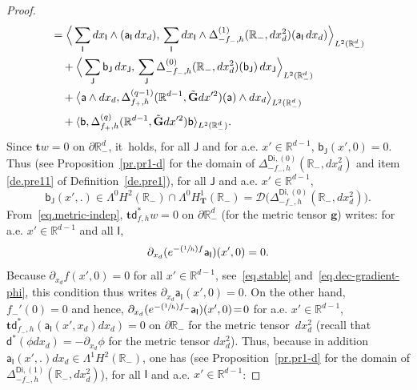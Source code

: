 \documentclass[JEP,XML,SOM,Unicode,NoEqCountersInSection,NoFloatCountersInSection,published]{cedram}
\newcommand{\Psfrac}[2]{(\sfrac{#1}{#2})}
\newcommand{\mbf}[1]{\mathbf{#1}}
\let\lp\langle
\let\rp\rangle
\let\pa\partial
\theoremstyle{plain}
\theoremstyle{definition}
\begin{document}
\begin{proof}
\begin{align}
&= \Big \lp \sum_{\mathsf I} dx_{\mathsf I}\wedge (\mathsf a_{\mathsf I}\, dx_d), \, \sum_{ \mathsf I } dx_{\mathsf I}\wedge\Delta^{(1)}_{-f_-,h}(\mathbb R_-,dx_d^2)(\mathsf a_{\mathsf I} \, dx_d)\Big\rp_{L^2(\mathbb R^d_-)} \\
\nonumber
&\quad + \Big \lp \sum_{ \mathsf J } \mathsf b_{\mathsf J}\, dx_{\mathsf J},\, \sum_{ \mathsf J } \Delta^{(0)}_{-f_-,h}(\mathbb R_-,dx_d^2)(\mathsf b_{\mathsf J})\, dx_{\mathsf J}\Big\rp_{L^2(\mathbb R^d_-)}\\
\nonumber
&\quad +\big \lp \mathsf a \wedge dx_d,\Delta^{(q-1)}_{f_+,h}(\mathbb R^{d-1}, \tilde{\mbf G}dx'^2)(\mathsf a)\wedge dx_d \big\rp_{L^2(\mathbb R^d_-)} \\
&\quad +\lp \mathsf b,\Delta^{(q)}_{f_+,h}(\mathbb R^{d-1}, \tilde{\mbf G}dx'^2)\mathsf b\rp_{L^2(\mathbb R^d_-)}.\notag
\end{align}
Since $\mbf t w =0$ on $\pa \mathbb R^d_-$, it~holds, for all
$\mathsf J$ and for a.e. $x'\in \mathbb R^{d-1}$, $ \mathsf
b_{\mathsf J}(x',0)=0$. Thus (see Proposition~\ref{pr.pr1-d} for the
domain of $\Delta_{-f_-,h}^{\mathsf{Di},(0)}(\mathbb R_-, dx_d^2)$ and
item \eqref{de.pre11} of Definition~\ref{de.pre1}),
for all $\mathsf J$ and a.e. $x'\in \mathbb R^{d-1}$,
\[
\mathsf b_{\mathsf J}(x',.)\in \Lambda^0H^2 (\mathbb R_-)\cap
\Lambda^0H^1_{\mbf T} (\mathbb R_-) = \mathcal D \bigl(\Delta_{-f_-,h}^{\mathsf{Di},(0)}(\mathbb R_-, dx_d^2) \bigr).
\]
From~\eqref{eq.metric-indep}, $\mbf t \mathsf d_{f,h}^*w =0$ on $\pa \mathbb R^d_-$ (for the metric tensor $ \mbf g$) writes: for a.e. $x'\in \mathbb R^{d-1}$ and all $\mathsf I$,
\begin{equation}\label{eq.domd*}
\partial_{x_d}(e^{-\Psfrac 1hf}\mathsf a_{\mathsf I})(x',0)=0.
\end{equation}
Because $\partial_{x_d} f(x',0)=0$ for all $x'\in \mathbb R^{d-1}$, see~\eqref{eq.stable} and~\eqref{eq.dec-gradient-phi}, this condition thus writes $\partial_{x_d}\mathsf a_{\mathsf I}(x',0)\!=\!0$. On the other hand, $f_-'(0)\!=\!0$ and hence, \hbox{$\partial_{x_d}(e^{-\Psfrac 1h f_-}\mathsf a_{\mathsf I})(x',0)\!=\!0$} for a.e. $x'\in \mathbb R^{d-1}$, \ie $\mbf t \mathsf d_{f_-,h}^* (\mathsf a_{\mathsf I}(x',x_d)dx_d) =0$ on $\pa \mathbb R_-$ for the metric tensor~$dx_d^2$ (recall that $\mathsf d^*(\phi dx_d)=-\partial_{x_d}\phi$ for the metric tensor $ dx_d^2$). Thus, because in addition $\mathsf a_{\mathsf I}(x',.) dx_d \in \Lambda^1H^2 (\mathbb R_-)$, one has (see Proposition~\ref{pr.pr1-d} for the domain of $\Delta_{-f_-,h}^{\mathsf{Di},(1)}(\mathbb R_-, dx_d^2)$), for all $\mathsf I$ and a.e. $x'\in \mathbb R^{d-1}$:

\end{proof}
\end{document}
